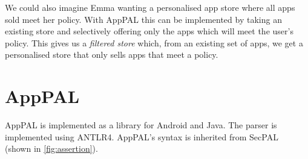 \documentclass[]{llncs}
\begin{document}
We could also imagine Emma wanting a personalised app store where all apps sold meet her policy.
With AppPAL this can be implemented by taking an existing store and selectively offering only the apps which will meet the user's policy.
This gives us a \emph{filtered store} which, from an existing set of apps, we get a personalised store that only sells apps that meet a policy.

\section{AppPAL}
\label{sec:details}
\label{ssec:language}

AppPAL is implemented as a library for Android and Java.
The parser is implemented using ANTLR4.
AppPAL's syntax is inherited from SecPAL~\cite{Becker:2006vh} (shown in \autoref{fig:assertion}).
\end{document}
